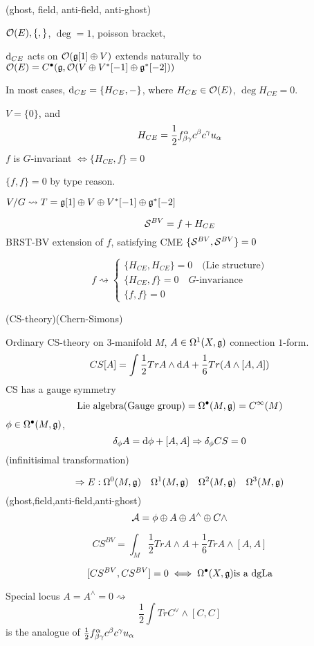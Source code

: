 (ghost, field, anti-field, anti-ghost)

$\mathcal{O}(E),\{,\}$, $\deg=1$, poisson bracket,

$\mathrm{d}_{CE}$ acts on $\mathcal{O}(\mathfrak{g}[1]\oplus V)$
extends naturally to $\mathcal{O}(E)=C^{\bullet}(\mathfrak{g},\mathcal{O}(V\oplus V^*[-1]\oplus \mathfrak{g}^*[-2]))$

In most cases, $\mathrm{d}_{CE}=\{H_{CE},-\}$, where $H_{CE}\in\mathcal{O}(E)$,
$\deg H_{CE}=0$.

\begin{example}
$V=\{0\}$, and
$$H_{CE}=\frac{1}{2}f^\alpha_{\beta\gamma}c^\beta c^\gamma u_\alpha$$
$f$ is $G$-invariant $\iff \{H_{CE},f\}=0$

$\{f,f\}=0$ by type reason.
\end{example}

$V/G\rightsquigarrow T=\mathfrak{g}[1]\oplus V\oplus V^*[-1]\oplus \mathfrak{g}^*[-2]$

$$\mathcal{S}^{BV}=f+H_{CE}$$
BRST-BV extension of $f$, satisfying CME $\{\mathcal{S}^{BV},\mathcal{S}^{BV}\}=0$

$$
  f\rightsquigarrow
  \left\{
    \begin{array}{c}
      \{H_{CE},H_{CE}\}=0\quad \text{(Lie structure)}\\
      \{H_{CE},f\}=0 \quad\text{$G$-invariance}\\
      \{f,f\}=0
    \end{array}
  \right.
$$

\begin{example}(CS-theory)(Chern-Simons)

Ordinary CS-theory on $3$-manifold $M$,
$A\in\Omega^1(X,\mathfrak{g})$ connection $1$-form.
$$CS[A]=\int \frac{1}{2}Tr A\wedge\mathrm{d} A+
\frac{1}{6}Tr(A\wedge[A,A])$$
CS has a gauge symmetry
$$\text{Lie algebra(Gauge group)}=\Omega^{\bullet}(M,\mathfrak{g})=C^\infty(M)$$
$\phi\in\Omega^{\bullet}(M,\mathfrak{g})$,
$$\delta_\phi A=\mathrm{d}\phi+[A,A]\Rightarrow \delta_\phi CS=0$$
(infinitisimal transformation)
\end{example}

$$\Rightarrow E: \Omega^0(M,\mathfrak{g})\quad
\Omega^1(M,\mathfrak{g})\quad \Omega^2(M,\mathfrak{g})\quad \Omega^3(M,\mathfrak{g})$$
(ghost,field,anti-field,anti-ghost)
$$\mathcal{A}=\phi\oplus A\oplus A^\wedge\oplus C\wedge$$

$$CS^{BV}=\int_M\frac{1}{2}Tr A\wedge A+\frac{1}{6}Tr A\wedge[A,A]$$

$$[CS^{BV},CS^{BV}]=0\iff \Omega^{\bullet}(X,\mathfrak{g}) \text{is a dgLa}$$

Special locus $A=A^\wedge =0\rightsquigarrow$
$$\frac{1}{2}\int Tr C^\vee\wedge [C,C]$$
is the analogue of $\frac{1}{2}f^\alpha_{\beta\gamma}c^\beta c^\gamma u_\alpha$

